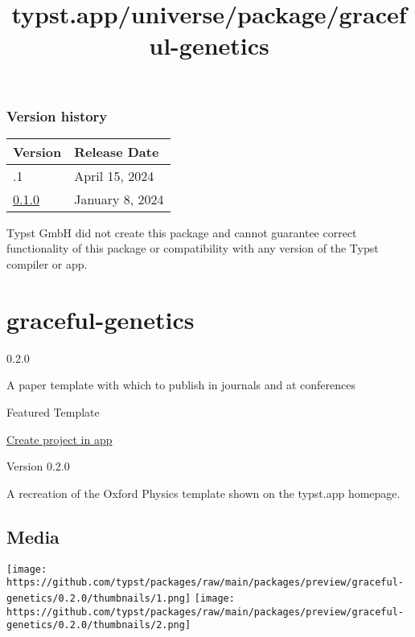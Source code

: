 \label{versions}
\subsubsection{Version history}\label{version-history}

\begin{longtable}[]{@{}ll@{}}
\toprule\noalign{}
Version & Release Date \\
\midrule\noalign{}
\endhead
\bottomrule\noalign{}
\endlastfoot
0.1.1 & April 15, 2024 \\
\href{https://typst.app/universe/package/treet/0.1.0/}{0.1.0} & January
8, 2024 \\
\end{longtable}

Typst GmbH did not create this package and cannot guarantee correct
functionality of this package or compatibility with any version of the
Typst compiler or app.


\title{typst.app/universe/package/graceful-genetics}

\label{banner}
\label{template-thumbnail}

\section{graceful-genetics}\label{graceful-genetics}

{ 0.2.0 }

A paper template with which to publish in journals and at conferences

{ } Featured Template

\href{/app?template=graceful-genetics&version=0.2.0}{Create project in
app}

\label{readme}
Version 0.2.0

A recreation of the Oxford Physics template shown on the typst.app
homepage.

\subsection{Media}\label{media}

\texttt{[image: https://github.com/typst/packages/raw/main/packages/preview/graceful-genetics/0.2.0/thumbnails/1.png]}
\texttt{[image: https://github.com/typst/packages/raw/main/packages/preview/graceful-genetics/0.2.0/thumbnails/2.png]}

